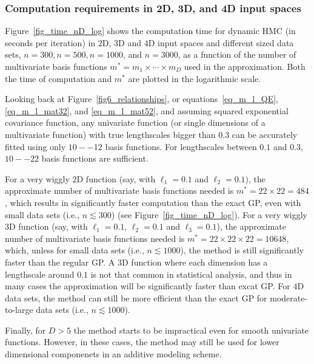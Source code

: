 \subsubsection{Computation requirements in 2D, 3D, and 4D input spaces}\label{sec_computation_nD}


Figure~\ref{fig_time_nD_log} shows the computation time for dynamic HMC (in seconds per iteration) in $2$D, $3$D and $4$D input spaces and different sized data sets, $n=300, n=500, n=1000$, and $n=3000$, as a function of the number of multivariate basis functions $m^*=m_1\times \cdots \times m_D$ used in the approximation.
Both the time of computation and $m^*$ are plotted in the logarithmic scale. 

Looking back at Figure~\ref{fig6_relationships}, or equations~\eqref{eq_m_l_QE}, \eqref{eq_m_l_mat32}, and \eqref{eq_m_l_mat52}, and assuming squared exponential covariance function, any univariate function (or single dimensions of a multivariate function) with true lengthscales bigger than $0.3$ can be accurately fitted using only $10--12$ basis functions. For lengthscales between $0.1$ and $0.3$, $10--22$ basis functions are sufficient.

For a very wiggly $2$D function (say, with $\ell_1=0.1$ and $\ell_2=0.1$), the approximate number of multivariate basis functions needed is $m^*=22\times 22= 484$, which results in significantly faster computation than the exact GP, even with small data sets (i.e., $n \lesssim 300$) (see Figure~\ref{fig_time_nD_log}). For a very wiggly $3$D function (say, with $\ell_1=0.1$, $\ell_2=0.1$ and $\ell_3=0.1$), the approximate number of multivariate basis functions needed is $m^*=22\times 22\times 22= 10648$, which, unless for small data sets (i.e., $n \lesssim 1000$), the method is still significantly faster than the regular GP. A $3$D function where each dimension has a lengthscale around $0.1$ is not that common in statistical analysis, and thus in many cases the approximation will be significantly faster than excat GP. For $4$D data sets, the method can still be more efficient than the exact GP for moderate-to-large data sets (i.e., $n \lesssim 1000$). 

Finally, for $D>5$ the method starts to be impractical even for smooth univariate functions. However, in these cases, the method may still be used for lower dimensional componenets in an additive modeling scheme.

